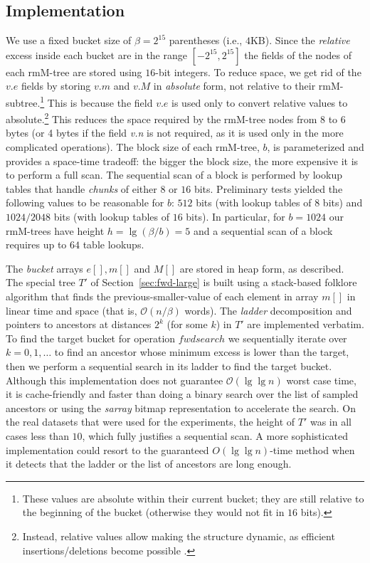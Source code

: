 \documentclass[11pt]{article}
\renewcommand{\log}{\lg}
\newcommand{\0}{\mathit{0}}
\newcommand{\1}{\mathit{1}}
\newcommand{\fwdsearch}{\mathit{fwdsearch}}
\newcommand{\Oh}[1]{\mathcal{O}\!\left(#1\right)}
\begin{document}
\subsection{Implementation}

We use a fixed bucket size of $\beta=2^{15}$ parentheses (i.e., $4$KB).
Since the \emph{relative} excess inside each bucket are in the range 
$[-2^{15}, 2^{15}]$ the fields of the nodes of each rmM-tree are stored 
using $16$-bit integers. To reduce space, we get rid of the $v.e$ fields by 
storing $v.m$ and $v.M$ in \emph{absolute} form, not relative to 
their rmM-subtree.\footnote{These values are absolute within their current 
bucket; they are still relative to the beginning of the bucket (otherwise they 
would not fit in $16$ bits).} This is because the field $v.e$ is used only to 
convert relative values to
absolute.\footnote{Instead, relative values allow making the structure
dynamic, as efficient insertions/deletions become possible \cite{NS14}.}
This reduces the space required by the rmM-tree nodes from 8
to 6 bytes (or 4 bytes if the field \emph{v.n} is not required, as it is
used only in the more complicated operations). The block size of each
rmM-tree, $b$, is parameterized and provides a space-time tradeoff:  the bigger
the block size, the more expensive it is to perform a full scan.  The sequential
scan of a block is performed by lookup tables that handle \emph{chunks} of
either $8$ or $16$ bits. Preliminary tests yielded the following values to be 
reasonable for $b$: $512$ bits (with lookup tables of $8$ bits) and
$1024/2048$ bits (with lookup tables of $16$ bits).  In particular, for $b=1024$
our rmM-trees have height $h = \lg (\beta/b) = 5$ and a sequential scan of a
block requires up to $64$ table lookups.

The \emph{bucket} arrays $e[], m[]$ and $M[]$ are stored in heap form, as 
described. The special tree $T'$ of Section~\ref{sec:fwd-large} is built
using a stack-based folklore algorithm that finds the previous-smaller-value
of each element in array $m[]$ in linear time and space (that is, $\Oh{n/\beta}$
words).  The \emph{ladder} decomposition and pointers to ancestors at
distances $2^k$ (for some $k$) in $T'$ are implemented verbatim.  To find the
target bucket for operation $\fwdsearch$ we sequentially iterate over
$k=0,1,\ldots$ to find an ancestor whose minimum excess is lower than the
target, then we perform a sequential search in its ladder to find the target
bucket.  Although this implementation does not guarantee $\Oh{\log\log n}$
worst case time, it is cache-friendly and faster than doing a binary search over
the list of sampled ancestors or using the \emph{sarray} bitmap representation
to accelerate the search. On the real datasets that were used for
the experiments, the height of $T'$ was in all cases less than $10$, which
fully justifies a sequential scan. A more
sophisticated implementation could resort to the guaranteed $O(\lg\lg n)$-time
method when it detects that the ladder or the list of ancestors are long enough.
\end{document}
